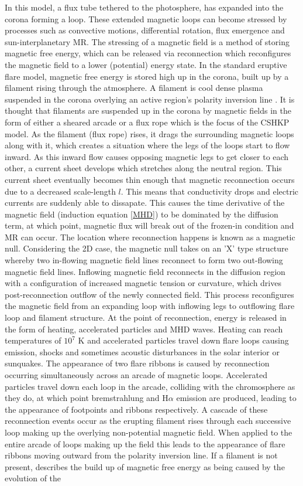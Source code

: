 In this model, a flux tube tethered to the photosphere, has expanded into the corona forming a loop. These extended magnetic loops can become stressed by processes such as convective motions, differential rotation, flux emergence and sun-interplanetary MR. The stressing of a magnetic field is a method of storing magnetic free energy, which can be released via reconnection which reconfigures the magnetic field to a lower (potential) energy state. In the standard eruptive flare model, magnetic free energy is stored high up in the corona, built up by a filament rising through the atmosphere. A filament is cool dense plasma suspended in the corona overlying an active region's polarity inversion line \citep{1955ApJ...121..349B}. It is thought that filaments are suspended up in the corona by magnetic fields in the form of either a sheared arcade or a flux rope which is the focus of the CSHKP model. As the filament (flux rope) rises, it drags the surrounding magnetic loops along with it, which creates a situation where the legs of the loops start to flow inward. As this inward flow causes opposing magnetic legs to get closer to each other, a current sheet develops which stretches along the neutral region. This current sheet eventually becomes thin enough that magnetic reconnection occurs due to a decreased scale-length $l$. This means that conductivity drops and electric currents are suddenly able to dissapate. This causes the time derivative of the magnetic field (induction equation \ref{MHD}) to be dominated by the diffusion term, at which point, magnetic flux will break out of the frozen-in condition and MR can occur. The location where reconnection happens is known as a magnetic null. Considering the 2D case, the magnetic null takes on an 'X' type structure whereby two in-flowing magnetic field lines reconnect to form two out-flowing magnetic field lines. Inflowing magnetic field reconnects in the diffusion region with a configuration of increased magnetic tension or curvature, which drives post-reconnection outflow of the newly connected field. This process reconfigures the magnetic field from an expanding loop with inflowing legs to outflowing flare loop and filament structure. At the point of reconnection, energy is released in the form of heating, accelerated particles and MHD waves. Heating can reach temperatures of $10^7$ K and accelerated particles travel down flare loops causing emission, shocks and sometimes acoustic disturbances in the solar interior or sunquakes. The appearance of two flare ribbons is caused by reconnection occurring simultaneously across an arcade of magnetic loops. Accelerated particles travel down each loop in the arcade, colliding with the chromosphere as they do, at which point bremstrahlung and H$\alpha$ emission are produced, leading to the appearance of footpoints and ribbons respectively. A cascade of these reconnection events occur as the erupting filament rises through each successive loop making up the overlying non-potential magnetic field. When applied to the entire arcade of loops making up the field this leads to the appearance of flare ribbons moving outward from the polarity inversion line. If a filament is not present, \cite{2005psci.book.....A} describes the build up of magnetic free energy as being caused by the evolution of the 